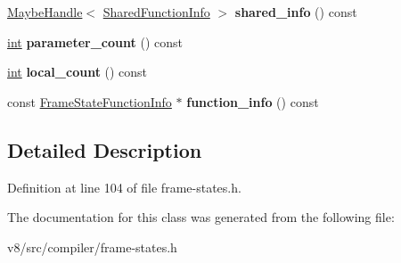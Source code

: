 \begin{DoxyCompactItemize}
\mbox{\hyperlink{classv8_1_1internal_1_1MaybeHandle}{Maybe\+Handle}}$<$ \mbox{\hyperlink{classv8_1_1internal_1_1SharedFunctionInfo}{Shared\+Function\+Info}} $>$ {\bfseries shared\+\_\+info} () const
\item 
\mbox{\label{classv8_1_1internal_1_1compiler_1_1FrameStateInfo_ab939f49aa74748ad202da99929e21ea5}} 
\mbox{\hyperlink{classint}{int}} {\bfseries parameter\+\_\+count} () const
\item 
\mbox{\label{classv8_1_1internal_1_1compiler_1_1FrameStateInfo_ab18c99d5345970637385f6e8ca1dbf13}} 
\mbox{\hyperlink{classint}{int}} {\bfseries local\+\_\+count} () const
\item 
\mbox{\label{classv8_1_1internal_1_1compiler_1_1FrameStateInfo_aff7127ad7286f3f4c805a64ec5876006}} 
const \mbox{\hyperlink{classv8_1_1internal_1_1compiler_1_1FrameStateFunctionInfo}{Frame\+State\+Function\+Info}} $\ast$ {\bfseries function\+\_\+info} () const
\end{DoxyCompactItemize}


\subsection{Detailed Description}


Definition at line 104 of file frame-\/states.\+h.



The documentation for this class was generated from the following file\+:\begin{DoxyCompactItemize}
\item 
v8/src/compiler/frame-\/states.\+h\end{DoxyCompactItemize}
